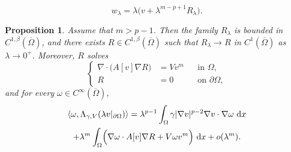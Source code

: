 \documentclass[10pt,a4paper]{amsart}
\newtheorem{prop}{Proposition}
\newcommand{\dd}{\,\mathrm{d}}
\newcommand{\la}{\langle}
\newcommand{\pr}{\partial}
\newcommand{\ra}{\rangle}
\begin{document}
\begin{equation}\label{eq:ansatz-small}
w_\lambda=\lambda\bigl(v+\lambda^{m-p+1}R_\lambda\bigr).
\end{equation}

\begin{prop}\label{prop:small-data}
Assume that $m>p-1$. Then the family $R_\lambda$ is bounded in $C^{1,\beta}(\overline\Omega)$, and there exists $R\in C^{1,\beta}(\overline\Omega)$ such that $R_\lambda\to R$ in $C^1(\overline\Omega)$ as $\lambda\to0^+$. Moreover, $R$ solves
\begin{equation}\label{eq:R-equation}
\left\{
\begin{aligned}
\nabla\cdot\bigl(A[v]\nabla R\bigr)&=Vv^m &&\text{in }\Omega,\\
R&=0 &&\text{on }\pr\Omega,
\end{aligned}
\right.
\end{equation}
and for every $\omega\in C^\infty(\overline\Omega)$,
\begin{multline}\label{eq:expansion-small}
\la\omega,\Lambda_{\gamma,V}(\lambda v|_{\pr\Omega})\ra
=\lambda^{p-1}\int_\Omega \gamma|\nabla v|^{p-2}\nabla v\cdot\nabla\omega\,\dd x\\
+\lambda^m\int_\Omega\Bigl(\nabla\omega\cdot A[v]\nabla R+V\omega v^m\Bigr)\,\dd x+o(\lambda^m).
\end{multline}
\end{prop}
\end{document}

